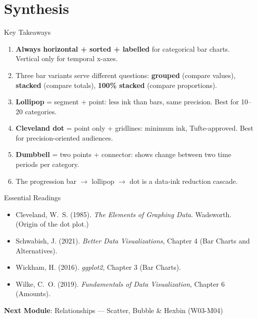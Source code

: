 \documentclass[10pt]{beamer}
\begin{document}
\section{Synthesis}

\begin{frame}{Key Takeaways}
  \begin{enumerate}
    \item \textbf{Always horizontal + sorted + labelled} for categorical
          bar charts. Vertical only for temporal x-axes.
    \item Three bar variants serve different questions: \textbf{grouped}
          (compare values), \textbf{stacked} (compare totals),
          \textbf{100\% stacked} (compare proportions).
    \item \textbf{Lollipop} = segment + point: less ink than bars,
          same precision. Best for 10--20 categories.
    \item \textbf{Cleveland dot} = point only + gridlines: minimum ink,
          Tufte-approved. Best for precision-oriented audiences.
    \item \textbf{Dumbbell} = two points + connector: shows change
          between two time periods per category.
    \item The progression bar $\rightarrow$ lollipop $\rightarrow$ dot
          is a data-ink reduction cascade.
  \end{enumerate}
\end{frame}

\begin{frame}{Essential Readings}
  \begin{itemize}
    \item Cleveland, W.~S. (1985). \emph{The Elements of Graphing Data}.
          Wadsworth. (Origin of the dot plot.)
    \item Schwabish, J. (2021). \emph{Better Data Visualizations},
          Chapter 4 (Bar Charts and Alternatives).
    \item Wickham, H. (2016). \emph{ggplot2}, Chapter 3 (Bar Charts).
    \item Wilke, C.~O. (2019). \emph{Fundamentals of Data Visualization},
          Chapter 6 (Amounts).
  \end{itemize}
  \vspace{6pt}
  \textbf{Next Module}: Relationships --- Scatter, Bubble \& Hexbin (W03-M04)
\end{frame}
\end{document}
